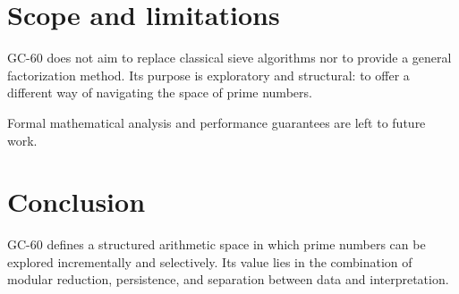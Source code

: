 \documentclass[11pt,a4paper]{article}
\begin{document}
\section*{Scope and limitations}

GC-60 does not aim to replace classical sieve algorithms nor to provide a general factorization method.
Its purpose is exploratory and structural:
to offer a different way of navigating the space of prime numbers.

Formal mathematical analysis and performance guarantees are left to future work.

\section*{Conclusion}

GC-60 defines a structured arithmetic space in which prime numbers can be explored incrementally and selectively.
Its value lies in the combination of modular reduction, persistence, and separation between data and interpretation.
\end{document}
